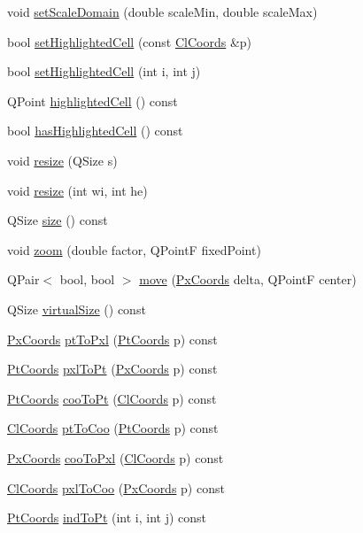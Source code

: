 \begin{DoxyCompactItemize}
void \hyperlink{class_map_painter_afaed21e6944cf1e62398f3f7a0067999}{set\-Scale\-Domain} (double scale\-Min, double scale\-Max)
\item 
bool \hyperlink{class_map_painter_ad7effe1c69fb1409d696dd54edd8bbb3}{set\-Highlighted\-Cell} (const \hyperlink{class_cl_coords}{\-Cl\-Coords} \&p)
\item 
bool \hyperlink{class_map_painter_a49c452342b60a341e7b3530141adeda8}{set\-Highlighted\-Cell} (int i, int j)
\item 
\-Q\-Point \hyperlink{class_map_painter_a528513a51ae87cce652e310587e59f9c}{highlighted\-Cell} () const 
\item 
bool \hyperlink{class_map_painter_ab0f0c512388d95b78d1118af8342fd16}{has\-Highlighted\-Cell} () const 
\item 
void \hyperlink{class_map_painter_ae215f704c3f1ee11bb89861b9b4b13d3}{resize} (\-Q\-Size s)
\item 
void \hyperlink{class_map_painter_a3280e72c6ffed5e7c550d4632a6de794}{resize} (int wi, int he)
\item 
\-Q\-Size \hyperlink{class_map_painter_a3ae925af3a8a14a83f70b8cbd8c22158}{size} () const 
\item 
void \hyperlink{class_map_painter_a2dacde51513a54fbbf45b44787cd0ee2}{zoom} (double factor, \-Q\-Point\-F fixed\-Point)
\item 
\-Q\-Pair$<$ bool, bool $>$ \hyperlink{class_map_painter_a55dd52865ad3f50b91dadd1f1b6f9352}{move} (\hyperlink{class_px_coords}{\-Px\-Coords} delta, \-Q\-Point\-F center)
\item 
\-Q\-Size \hyperlink{class_map_painter_ac83fce82c6257bd251bc8cd37419af56}{virtual\-Size} () const 
\item 
\hyperlink{class_px_coords}{\-Px\-Coords} \hyperlink{class_map_painter_ac9c2bb380681752eecdd66037ca73192}{pt\-To\-Pxl} (\hyperlink{class_pt_coords}{\-Pt\-Coords} p) const 
\item 
\hyperlink{class_pt_coords}{\-Pt\-Coords} \hyperlink{class_map_painter_af659a9c0dc9d9cd160dafc3aaef9974b}{pxl\-To\-Pt} (\hyperlink{class_px_coords}{\-Px\-Coords} p) const 
\item 
\hyperlink{class_pt_coords}{\-Pt\-Coords} \hyperlink{class_map_painter_a80a2a8fb072ef7e672369a07bb46b059}{coo\-To\-Pt} (\hyperlink{class_cl_coords}{\-Cl\-Coords} p) const 
\item 
\hyperlink{class_cl_coords}{\-Cl\-Coords} \hyperlink{class_map_painter_a00f55d40c322ff5f2038a6515423f9f1}{pt\-To\-Coo} (\hyperlink{class_pt_coords}{\-Pt\-Coords} p) const 
\item 
\hyperlink{class_px_coords}{\-Px\-Coords} \hyperlink{class_map_painter_a4162990e1c9ed17877c0f5a7ad33f606}{coo\-To\-Pxl} (\hyperlink{class_cl_coords}{\-Cl\-Coords} p) const 
\item 
\hyperlink{class_cl_coords}{\-Cl\-Coords} \hyperlink{class_map_painter_a8f14b86f89dabf7183ae960284aaf0b5}{pxl\-To\-Coo} (\hyperlink{class_px_coords}{\-Px\-Coords} p) const 
\item 
\hyperlink{class_pt_coords}{\-Pt\-Coords} \hyperlink{class_map_painter_a1902b1ee672739e47d52a82c4fe3c657}{ind\-To\-Pt} (int i, int j) const 
\end{DoxyCompactItemize}


